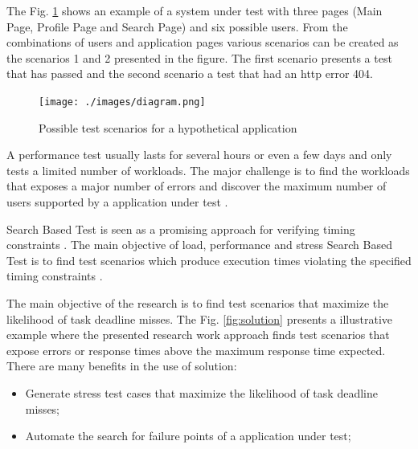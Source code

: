The Fig. \ref{fig:example} shows an example  of a system under test with three pages (Main Page, Profile Page and Search Page) and six possible users. From the combinations of users and application pages various scenarios can be created as the scenarios 1 and 2 presented in the figure. The first scenario presents a test that has passed and the second scenario a test that had an http error 404.

\begin{figure}[ht]
\centering
\caption{Possible test scenarios for a hypothetical application}
\texttt{[image: ./images/diagram.png]}
\label{fig:example}
\end{figure}

A performance test usually lasts for several hours or even a few days and only tests a limited number of workloads. The major challenge is to find the workloads  that exposes a major number of errors and discover the maximum number of users supported by a application under test \cite{Barna2011}. 

Search Based  Test is seen as a promising approach for verifying timing constraints \cite{Afzal2009a}. The main objective of load, performance and stress Search Based Test is to find test scenarios which produce execution times violating the specified timing constraints \cite{Sullivan}. 


The main objective of the research is to find test scenarios that maximize the likelihood of task deadline misses. The Fig. \ref{fig:solution} presents a illustrative example where the presented research work approach finds test scenarios that expose errors or response times above the maximum response time expected. There are many benefits in the use of solution:

\begin{itemize}
\item Generate stress test cases that maximize the likelihood of task deadline misses;
\item Automate the search for failure points of a application under test;
\end{itemize}



